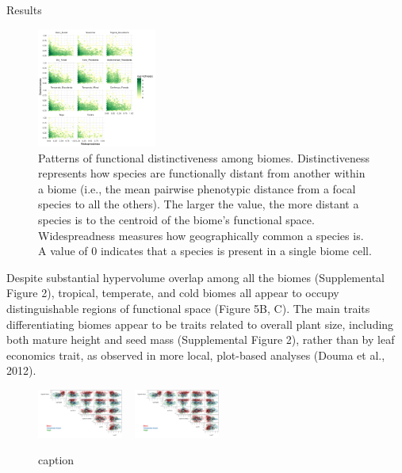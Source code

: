 \documentclass[final]{beamer}
\newlength{\twocolwid}
\begin{document}
\begin{frame}[t]
\begin{columns}[t]
\begin{column}{\twocolwid}
\begin{alertblock}{Results}
\begin{multicols}{2}
\begin{figure}[h]
	\centering
	\includegraphics[width=0.35\textwidth]{./figures/All_biomes_heatmap_logTraits.pdf}
	\caption{Patterns of functional distinctiveness among biomes. Distinctiveness represents how species are functionally distant from another within a biome (i.e., the mean pairwise phenotypic distance from a focal species to all the others). The larger the value, the more distant a species is to the centroid of the biome's functional space. Widespreadness measures how geographically common a species is. A value of 0 indicates that a species is present in a single biome cell. }
	\label{fig:distinct_common}
\end{figure}



   Despite substantial hypervolume overlap among all the biomes (Supplemental Figure 2), tropical, temperate, and cold biomes all appear to occupy distinguishable regions of functional space (Figure 5B, C). The main traits differentiating biomes appear to be traits related to overall plant size, including both mature height and seed mass (Supplemental Figure 2), rather than by leaf economics trait, as observed in more local, plot-based analyses (Douma et al., 2012).   		

\begin{figure}[h]
	\centering
	\includegraphics[width=0.25\textwidth]{./figures/Hypervolumes}
	~
	\includegraphics[width=0.25\textwidth]{./figures/Hypervolumes}
	\caption{caption}
	\label{fig:growth_forms}
\end{figure}




\end{multicols}
\end{alertblock}
\end{column}
\end{columns}
\end{frame}
\end{document}
